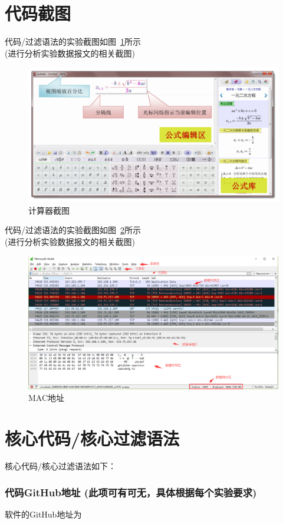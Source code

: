 \documentclass[a4paper,12pt]{report}
\begin{document}
\section{代码截图}
\songti
\begin{spacing}{1.5}
代码/过滤语法的实验截图如图~\ref{pic1}所示\\
\indent\setlength\parindent{2em}(进行分析实验数据报文的相关截图)

\begin{figure}[htb]
  \centering
\includegraphics[width=12cm]{figure/calculator.png}\caption{计算器截图}\label{pic1}
\end{figure}


代码/过滤语法的实验截图如图~\ref{pic2}所示\\
\indent\setlength\parindent{2em}(进行分析实验数据报文的相关截图)

\begin{figure}[htb]
  \centering
\includegraphics[width=12cm]{figure/pic2.png}\caption{MAC地址}\label{pic2}
\end{figure}

\end{spacing}



\section{核心代码/核心过滤语法}
\songti
\begin{spacing}{1.5}
核心代码/核心过滤语法如下：

\subsubsection{代码GitHub地址 (此项可有可无，具体根据每个实验要求)} 
软件的GitHub地址为

\end{spacing}
\end{document}

